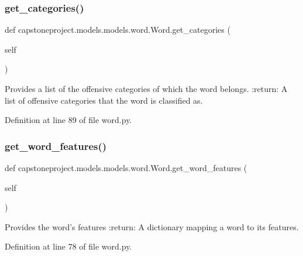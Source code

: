 \subsubsection{\texorpdfstring{get\+\_\+categories()}{get\_categories()}}
{\footnotesize\ttfamily def capstoneproject.\+models.\+models.\+word.\+Word.\+get\+\_\+categories (\begin{DoxyParamCaption}\item[{}]{self }\end{DoxyParamCaption})}

\begin{DoxyVerb}Provides a list of the offensive categories of which the word belongs.
:return: A list of offensive categories that the word is classified as.
\end{DoxyVerb}
 

Definition at line 89 of file word.\+py.

\mbox{\label{classcapstoneproject_1_1models_1_1models_1_1word_1_1_word_a341fd09dc63e4f208ac0d1fc1669e7fe}} 
\subsubsection{\texorpdfstring{get\+\_\+word\+\_\+features()}{get\_word\_features()}}
{\footnotesize\ttfamily def capstoneproject.\+models.\+models.\+word.\+Word.\+get\+\_\+word\+\_\+features (\begin{DoxyParamCaption}\item[{}]{self }\end{DoxyParamCaption})}

\begin{DoxyVerb}Provides the word's features
:return: A dictionary mapping a word to its features.
\end{DoxyVerb}
 

Definition at line 78 of file word.\+py.

\mbox{\label{classcapstoneproject_1_1models_1_1models_1_1word_1_1_word_a3a9a46943c7d9b829b0d2cf4edc91f96}} 
